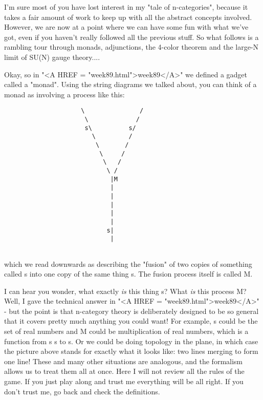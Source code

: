 



I'm sure most of you have lost interest in my "tale of n-categories",
because it takes a fair amount of work to keep up with all the abstract
concepts involved.  However, we are now at a point where we can have
some fun with what we've got, even if you haven't really followed all
the previous stuff.  So what follows is a rambling tour through monads,
adjunctions, the 4-color theorem and the large-N limit of SU(N) gauge
theory....

Okay, so in "<A HREF = "week89.html">week89</A>" we defined a gadget called a "monad".  Using
the string diagrams we talked about, you can think of a monad as
involving a process like this:


\begin{verbatim}
                     \               /
                      \             /
                      s\          s/
                        \         /
                         \       /
                          \     /
                           \   /
                            \ /
                             |M               
                             |
                             |
                             |
                             |
                             |
                            s|
                             |


\end{verbatim}
    
which we read downwards as describing the "fusion" of two copies of something 
called s into one copy of the same thing s.  The fusion process itself is 
called M.

I can hear you wonder, what exactly \emph{is} this thing s?  What 
\emph{is} this 
process M?  Well, I gave the technical answer in "<A HREF = "week89.html">week89</A>" - but the 
point is that n-category theory is deliberately designed to be so 
general that it covers pretty much anything you could want!  For example, 
s could be the set of real numbers and M could be multiplication of real 
numbers, which is a function from s \times  s to s.  Or we could be doing 
topology in the plane, in which case the picture above stands for exactly 
what it looks like: two lines merging to form one line!  These and many 
other situations are analogous, and the formalism allows us to treat them 
all at once.  Here I will not review all the rules of the game.  If you 
just play along and trust me everything will be all right.  If you
don't trust me, go back and check the definitions.  

